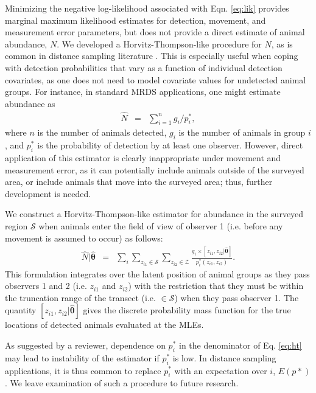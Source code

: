 \documentclass[aoas,preprint]{imsart}
\numberwithin{equation}{section}
\theoremstyle{plain}
\begin{document}
Minimizing the negative log-likelihood associated with Eqn. \ref{eq:lik} provides marginal maximum likelihood estimates for detection, movement, and measurement error parameters, but does not provide a direct estimate of animal abundance, $N$.  We developed a Horvitz-Thompson-like procedure for $N$, as is common in distance sampling literature \citep[e.g.][]{BucklandEtAl2004}.  This is especially useful when coping with detection probabilities that vary as a function of individual detection covariates, as one does not need to model covariate values for undetected animal groups.  For instance, in standard MRDS applications, one might estimate abundance as
\begin{eqnarray*}
  \hat{N} & = & \sum_{i=1}^n g_i / p_i^*,
\end{eqnarray*}
where $n$ is the number of animals detected, $g_i$ is the number of animals in group $i$, and $p_i^*$ is the probability of detection by at least one observer.
However, direct application of this estimator is clearly inappropriate under movement and measurement error, as it can potentially include animals outside of the surveyed area, or include animals that move into the surveyed area; thus, further development is needed.

We construct a Horvitz-Thompson-like estimator for abundance in the surveyed region $\mathcal{S}$ when animals enter the field of view of observer 1 (i.e. before any movement is assumed to occur) as follows:
\begin{eqnarray}
  \hat{N}|\hat{\boldsymbol{\theta}} & = & \sum_i \sum_{z_{i1} \in \mathcal{S}} \sum_{z_{i2} \in \mathcal{Z}} \frac{g_i \times [{z}_{i1},{z}_{i2} | \hat{\boldsymbol{\theta}}]}{p_i^*(z_{i1},z_{i2})}.
  \label{eq:ht}
\end{eqnarray}
This formulation integrates over the latent position of animal groups as they pass observers 1 and 2 (i.e. $z_{i1}$ and $z_{i2}$) with the restriction that they must be within the truncation range of the transect (i.e. $\in \mathcal{S}$) when they pass observer 1. The quantity $[{z}_{i1},{z}_{i2} | \hat{\boldsymbol{\theta}}]$ gives the discrete probability mass function for the true locations of detected animals evaluated at the MLEs.

As suggested by a reviewer, dependence on $p_i^*$ in the denominator of Eq. \ref{eq:ht} may lead to instability of the estimator if $p_i^*$ is low.  In distance sampling applications, it is thus common to replace $p_i^*$ with an expectation over $i$, $E(p*)$ \citep[][Eq. 6.11]{LaakeBorchers2004}.
We leave examination of such a procedure to future research.
\end{document}

